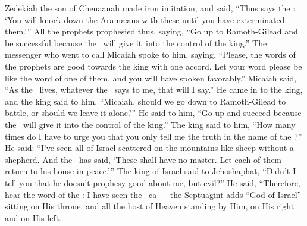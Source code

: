 \begin{inparaenum}
   Zedekiah the son of Chenaanah made iron imitation, and said, ``Thus says the \lord: `You will knock down the Aram\ae{}ans with these until you have exterminated them.'\thinspace''%
   All the prophets prophesied thus, saying, ``Go up to Ramoth-Gilead and be successful because the \lord\ will give it\understood\ into the control of the king.''%
   The messenger who went to call Micaiah spoke to him, saying, ``Please, the words of the prophets are good towards the king with one accord. Let your word please be like the word of one of them, and you will have spoken favorably.''%
   Micaiah said, ``As the \lord\ lives, whatever the \lord\ says to me, that will I say.''%
   He came in to the king, and the king said to him, ``Micaiah, should we go down to Ramoth-Gilead to battle, or should we leave it alone?'' He said to him, ``Go up and succeed because the \lord\ will give it into the control of the king.''%
   The king said to him, ``How many times do I have to urge you that you only tell me the truth in the name of the \lord?''%
   He said: ``I've seen all of Israel scattered on the mountains like sheep without a shepherd. And the \lord\ has said, `These shall have no master. Let each of them return to his house in peace.'\thinspace''%
   The king of Israel said to Jehoshaphat, ``Didn't I tell you that he doesn't prophesy good about me, but evil?''%
   He said, ``Therefore, hear the word of the \lord: I have seen the \lord\ ca{\septuagint\ + }{the Septuagint adds ``God of Israel''} sitting on His throne, and all the host of Heaven standing by Him, on His right and on His left.%

\end{inparaenum}
